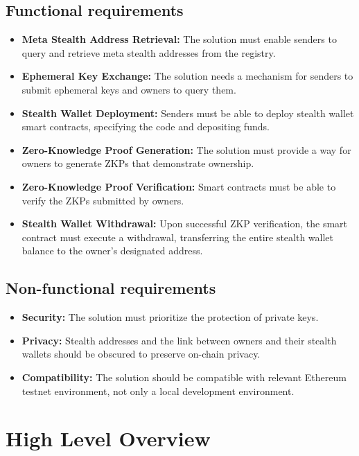 \subsection*{Functional requirements}
\begin{itemize}
    \item \textbf{Meta Stealth Address Retrieval:} The solution must enable senders
        to query and retrieve meta stealth addresses from the registry.
    \item \textbf{Ephemeral Key Exchange:} The solution needs a mechanism for senders
        to submit ephemeral keys and owners to query them.
    \item \textbf{Stealth Wallet Deployment:} Senders must be able to deploy
        stealth wallet smart contracts, specifying the code and depositing funds.
    \item \textbf{Zero-Knowledge Proof Generation:} The solution must provide a way
        for owners to generate ZKPs that demonstrate ownership.
    \item \textbf{Zero-Knowledge Proof Verification:} Smart contracts must be able
        to verify the ZKPs submitted by owners.
    \item \textbf{Stealth Wallet Withdrawal:} Upon successful ZKP
        verification, the smart contract must execute a withdrawal, transferring
        the entire stealth wallet balance to the owner's designated address.
\end{itemize}

\subsection*{Non-functional requirements}
\begin{itemize}
    \item \textbf{Security:} The solution must prioritize the protection of private keys.
    \item \textbf{Privacy:} Stealth addresses and the link between owners and
        their stealth wallets should be obscured to preserve on-chain privacy.
    \item \textbf{Compatibility:} The solution should be compatible with
        relevant Ethereum testnet environment, not only a local
        development environment.
\end{itemize}


\section{High Level Overview}

